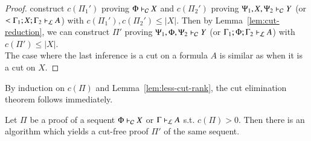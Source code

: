 \begin{proof}
  construct $c(\Pi_1')$ proving $\Phi  \vdash_\mathcal{C}  \mathit{X}$ and $c(\Pi_2')$ proving
  $\Psi_{{\mathrm{1}}}  ,  \mathit{X}  ,  \Psi_{{\mathrm{2}}}  \vdash_\mathcal{C}  \mathit{Y}$ (or $<\Gamma_{{\mathrm{1}}}  ;  \mathit{X}  ;  \Gamma_{{\mathrm{2}}}  \vdash_\mathcal{L}  \mathit{A}$) with
  $c(\Pi_1'), c(\Pi_2')\leq |X|$. Then by Lemma~\ref{lem:cut-reduction}, we
  can construct $\Pi'$ proving $\Psi_{{\mathrm{1}}}  ,  \Phi  ,  \Psi_{{\mathrm{2}}}  \vdash_\mathcal{C}  \mathit{Y}$ (or
  $\Gamma_{{\mathrm{1}}}  ;  \Phi  ;  \Gamma_{{\mathrm{2}}}  \vdash_\mathcal{L}  \mathit{A}$) with $c(\Pi')\leq |X|$. \\
  The case where the last inference is a cut on a formula $A$ is similar as
  when it is a cut on $X$.
\end{proof}
\noindent
By induction on $c(\Pi)$ and Lemma~\ref{lem:less-cut-rank}, the cut
elimination theorem follows immediately.
\begin{theorem}
  Let $\Pi$ be a proof of a sequent $\Phi  \vdash_\mathcal{C}  \mathit{X}$ or $\Gamma  \vdash_\mathcal{L}  \mathit{A}$ s.t.
  $c(\Pi)>0$. Then there is an algorithm which yields a cut-free proof
  $\Pi'$ of the same sequent.
\end{theorem}
